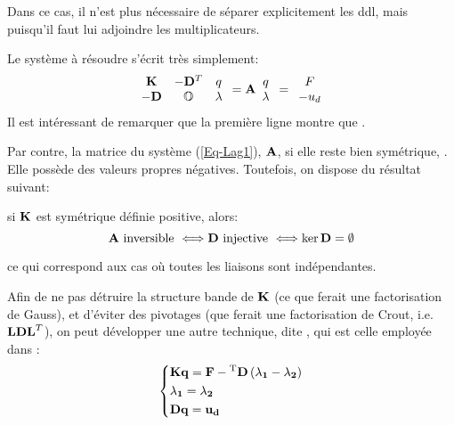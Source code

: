 Dans ce cas, il n'est plus nécessaire de séparer explicitement les ddl, mais  puisqu'il faut lui adjoindre les multiplicateurs.

Le système à résoudre s'écrit très simplement:
\begin{equation}\label{Eq-Lag1}
\mathbf{\begin{array}{cc} \mathbf{K} & -\mathbf{D}^T\\ -\mathbf{D} & \mathbb{O}{} \end{array}}
\mathbf{\begin{array}{c} q\\ \lambda \end{array}} =
\mathbf{A}
\mathbf{\begin{array}{c} q\\ \lambda \end{array}} =
\mathbf{\begin{array}{c} F\\ -u_d \end{array}}
\end{equation}
Il est intéressant de remarquer que la première ligne montre que .

Par contre, la matrice du système (\ref{Eq-Lag1}), $\mathbf{A}$, si elle reste bien symétrique, . Elle possède des valeurs propres négatives.
\medskipvm
Toutefois, on dispose du résultat suivant:

\begin{theoreme}
si $\mathbf{K}$ est symétrique définie positive, alors:
\begin{equation}
\mathbf{A} \text{ inversible } \Longleftrightarrow \mathbf{D} \text{ injective } \Longleftrightarrow \ker \mathbf{D} = \emptyset
\end{equation}
\end{theoreme}
ce qui correspond aux cas où toutes les liaisons sont indépendantes.

\bigskipvm
Afin de ne pas détruire la structure bande de $\mathbf{K}$ (ce que ferait une factorisation de Gauss), 
et d'éviter des pivotages (que ferait une factorisation de Crout, i.e. $\mathbf{LDL}^T$), on peut développer une autre technique, dite , qui est celle employée dans \castem:
\begin{equation}
\left\{\begin{aligned}
&\mathbf{K}\mathbf{q} = \mathbf{F} - {}^\mathrm{T}\mathbf{D}\left(\mathbf{\lambda_1} - \mathbf{\lambda_2}\right) \\
&\mathbf{\lambda_1} = \mathbf{\lambda_2} \\ 
&\mathbf{D}\mathbf{q} = \mathbf{u_d}
\end{aligned}\right.
\end{equation}

